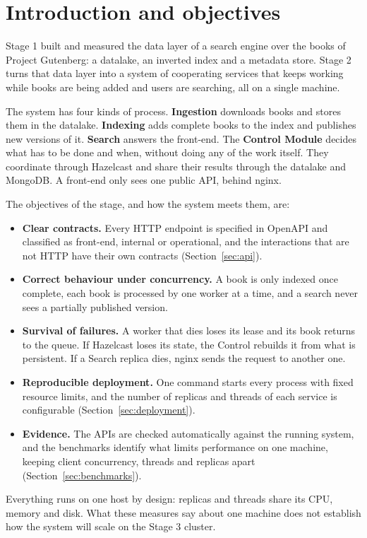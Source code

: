 \section{Introduction and objectives}
\label{sec:intro}

Stage 1 built and measured the data layer of a search engine over the books of Project Gutenberg: a
datalake, an inverted index and a metadata store. Stage 2 turns that data layer into a system of
cooperating services that keeps working while books are being added and users are searching, all on a
single machine.

The system has four kinds of process. \textbf{Ingestion} downloads books and stores them in the datalake.
\textbf{Indexing} adds complete books to the index and publishes new versions of it. \textbf{Search}
answers the front-end. The \textbf{Control Module} decides what has to be done and when, without doing
any of the work itself. They coordinate through Hazelcast and share their results through the datalake and
MongoDB. A front-end only sees one public API, behind nginx.

The objectives of the stage, and how the system meets them, are:

\begin{itemize}
  \item \textbf{Clear contracts.} Every HTTP endpoint is specified in OpenAPI and classified as
        front-end, internal or operational, and the interactions that are not HTTP have their own
        contracts (Section~\ref{sec:api}).
  \item \textbf{Correct behaviour under concurrency.} A book is only indexed once complete, each book
        is processed by one worker at a time, and a search never sees a partially published version.
  \item \textbf{Survival of failures.} A worker that dies loses its lease and its book returns to the
        queue. If Hazelcast loses its state, the Control rebuilds it from what is persistent. If a Search
        replica dies, nginx sends the request to another one.
  \item \textbf{Reproducible deployment.} One command starts every process with fixed resource limits,
        and the number of replicas and threads of each service is configurable
        (Section~\ref{sec:deployment}).
  \item \textbf{Evidence.} The APIs are checked automatically against the running system, and the
        benchmarks identify what limits performance on one machine, keeping client concurrency, threads
        and replicas apart (Section~\ref{sec:benchmarks}).
\end{itemize}

Everything runs on one host by design: replicas and threads share its CPU, memory and disk. What these
measures say about one machine does not establish how the system will scale on the Stage 3 cluster.
